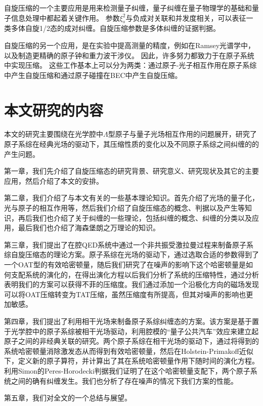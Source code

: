 自旋压缩的一个主要应用是用来检测量子纠缠，量子纠缠在量子物理学的基础和量子信息处理中都起着关键作用。 参数$\xi_s^2$与负成对关联和并发度相关，可以表征一类多体自旋1/2态的成对纠缠。自旋压缩参数是多体纠缠的证据判据。

自旋压缩的另一个应用，是在实验中提高测量的精度，例如在Ramsey光谱学中，以及制造更精确的原子钟和重力波干涉仪。 因此，许多努力都致力于在原子系统中实现压缩。 这些工作基本上可以分为两类：通过原子-光子相互作用在原子系综中产生自旋压缩和通过原子碰撞在BEC中产生自旋压缩。

\vbox{}
\section{本文研究的内容}\label{section14}
\vbox{}
本文的研究主要围绕在光学腔中$\Lambda$型原子与量子光场相互作用的问题展开，研究了原子系综在经典光场的驱动下，其压缩性质的变化以及不同原子系综之间纠缠的的产生问题。

第一章，我们先介绍了自旋压缩态的研究背景、研究意义、研究现状及其它的主要应用，然后介绍了本文的安排。

第二章，我们介绍了与本文有关的一些基本理论知识。首先介绍了光场的量子化，光与原子的相互作用等，然后我们介绍了自旋压缩态的概念、判据以及产生等知识，再后我们也介绍了关于纠缠的一些理论，包括纠缠的概念、纠缠的分类以及应用，最后我们也介绍了海森堡朗之万理论的知识。

第三章，我们提出了在腔QED系统中通过一个非共振受激拉曼过程来制备原子系综自旋压缩态的理论方案。原子系综在光场的驱动下，通过选取合适的参数得到了一个OAT型的有效哈密顿量，随后我们研究了在噪声的影响下这个哈密顿量是如何支配系统的演化的，在得出演化方程以后我们分析了系统的压缩特性，通过分析表明我们的方案可以获得不菲的压缩度。我们通过添加一个沿极化方向的磁场发现可以将OAT压缩转变为TAT压缩，虽然压缩度有所提高，但其对噪声的影响也更加敏感。

第四章，我们提出了利用相干光场来制备原子系综纠缠态的方案。该方案是基于置于光学腔中的原子系综被相干光场驱动，利用腔模的“量子公共汽车”效应来建立起原子之间的非经典关联的研究。两个原子系综在相干光场的驱动下，通过将得到的系统哈密顿量消除激发态从而得到有效哈密顿量，然后在Holstein-Primakoff近似下，定义新的原子算符，并计算出了其在系统哈密顿量作用下随时间的演化方程。利用Simon的Peres-Horodecki判据我们证明了在这个哈密顿量支配下，两个原子系统之间的确有纠缠发生。我们也分析了存在噪声的情况下我们方案的性能。

第五章，我们对全文的一个总结与展望。






